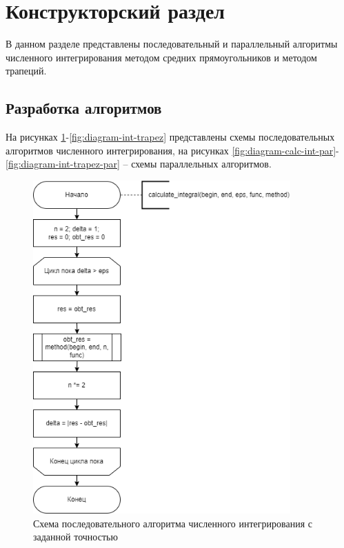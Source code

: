 \section{Конструкторский раздел \hfill}
\vspace{\baselineskip}

В данном разделе представлены последовательный и параллельный алгоритмы численного интегрирования методом средних прямоугольников и методом трапеций.

\subsection{Разработка алгоритмов}

На рисунках \ref{fig:diagram-calc-int}-\ref{fig:diagram-int-trapez} представлены схемы последовательных алгоритмов численного интегрирования, на рисунках \ref{fig:diagram-calc-int-par}-\ref{fig:diagram-int-trapez-par} -- схемы параллельных алгоритмов.

\begin{figure}[h!btp]
	\centering
	\includegraphics[width=280pt]{inc/calc_int.png}
	\caption{Схема последовательного алгоритма численного интегрирования с заданной точностью}
	\label{fig:diagram-calc-int}	
\end{figure}

\clearpage

